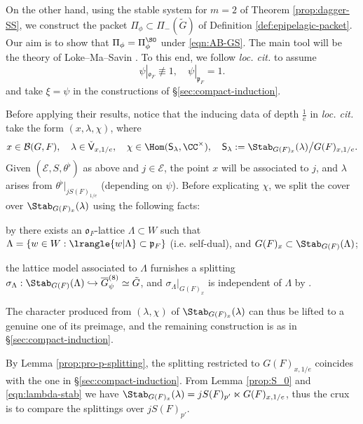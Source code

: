 \documentclass[a4paper,10pt]{article}
\begin{document}
On the other hand, using the stable system for $m=2$ of Theorem \ref{prop:dagger-SS}, we construct the packet $\Pi_\phi \subset \Pi_-(\tilde{G})$ of Definition \ref{def:epipelagic-packet}. Our aim is to show that $\Pi_\phi = \Pi_\phi^{\SO}$ under \eqref{eqn:AB-GS}. The main tool will be the theory of Loke--Ma--Savin \cite{LMS16}. To this end, we follow \textit{loc. cit.} to assume
\[ \psi|_{\mathfrak{o}_F} \not\equiv 1, \quad \psi|_{\mathfrak{p}_F} = 1. \]
and take $\xi = \psi$ in the constructions of \S\ref{sec:compact-induction}.

Before applying their results, notice that the inducing data of depth $\frac{1}{e}$ in \textit{loc. cit.} take the form $(x, \lambda, \chi)$, where
\[ x \in \mathcal{B}(G, F), \quad \lambda \in \check{\mathsf{V}}_{x,1/e}, \quad \chi \in \Hom(\mathsf{S}_\lambda, \CC^\times), \quad \mathsf{S}_\lambda := \Stab_{G(F)_x}(\lambda) \big/ G(F)_{x, 1/e}. \]
Given $(\mathcal{E}, S, \theta^\flat)$ as above and $j \in \mathcal{E}$, the point $x$ will be associated to $j$, and $\lambda$ arises from $\theta^\flat|_{jS(F)_{1/e}}$ (depending on $\psi$). Before explicating $\chi$, we split the cover over $\Stab_{G(F)_x}(\lambda)$ using the following facts:
\begin{compactitem}
	\item by \cite[\S 3.4]{LMS16} there exists an $\mathfrak{o}_F$-lattice $\Lambda \subset W$ such that $\Lambda = \left\{w \in W: \lrangle{w|\Lambda} \subset \mathfrak{p}_F \right\}$ (i.e. self-dual), and $G(F)_x \subset \Stab_{G(F)}(\Lambda)$;
	\item the lattice model \cite[Chapitre 2, II.8]{MVW87} associated to $\Lambda$ furnishes a splitting $\sigma_\Lambda: \Stab_{G(F)}(\Lambda) \hookrightarrow \overline{G}_\psi^{(8)} \simeq \tilde{G}$, and $\sigma_\Lambda|_{G(F)_x}$ is independent of $\Lambda$ by \cite[Lemma A.3.1]{LMS16}.
\end{compactitem}
The character produced from $(\lambda, \chi)$ of $\Stab_{G(F)_x}(\lambda)$ can thus be lifted to a genuine one of its preimage, and the remaining construction is as in \S\ref{sec:compact-induction}.

By Lemma \ref{prop:pro-p-splitting}, the splitting restricted to $G(F)_{x, 1/e}$ coincides with the one in \S\ref{sec:compact-induction}. From Lemma \ref{prop:S_0} and \eqref{eqn:lambda-stab} we have $\Stab_{G(F)_x}(\lambda) = jS(F)_{p'} \ltimes G(F)_{x, 1/e}$, thus the crux is to compare the splittings over $jS(F)_{p'}$.
\end{document}
